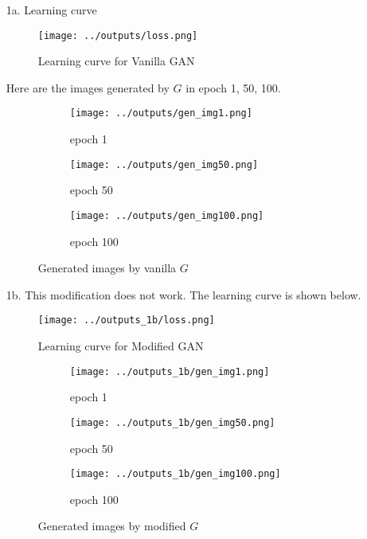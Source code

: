 \documentclass[a4paper]{article}
\theoremstyle{definition}
\newenvironment{soln}{
	\leavevmode\color{blue}\ignorespaces
}{}
\begin{document}
	\begin{soln}
		
		\begin{itemize}
			\item[1a.] 
			Learning curve
			\begin{figure}[H]
				\centering
				\texttt{[image: ../outputs/loss.png]}
				\caption{Learning curve for Vanilla GAN}
				\label{fig:vanilla_gan}
			\end{figure}
			Here are the images generated by $G$ in epoch 1, 50, 100.
			\begin{figure}[H]
				\centering
				\begin{subfigure}[b]{0.3\textwidth}
					\centering
					\texttt{[image: ../outputs/gen\_img1.png]}
					\caption{epoch 1}
				\end{subfigure}
				\hfill
				\begin{subfigure}[b]{0.3\textwidth}
					\centering
					\texttt{[image: ../outputs/gen\_img50.png]}
					\caption{epoch 50}
				\end{subfigure}
				\hfill
				\begin{subfigure}[b]{0.3\textwidth}
					\centering
					\texttt{[image: ../outputs/gen\_img100.png]}
					\caption{epoch 100}
				\end{subfigure}
				\caption{Generated images by vanilla $G$}
				\label{fig:vanilla_gan_img}
			\end{figure}

			\item[1b.]
			This modification does not work. The learning curve is shown below. 
			\begin{figure}[H]
				\centering
				\texttt{[image: ../outputs\_1b/loss.png]}
				\caption{Learning curve for Modified GAN}
				\label{fig:modified_gan}
			\end{figure}
			\begin{figure}[H]
				\centering
				\begin{subfigure}[b]{0.3\textwidth}
					\centering
					\texttt{[image: ../outputs\_1b/gen\_img1.png]}
					\caption{epoch 1}
				\end{subfigure}
				\hfill
				\begin{subfigure}[b]{0.3\textwidth}
					\centering
					\texttt{[image: ../outputs\_1b/gen\_img50.png]}
					\caption{epoch 50}
				\end{subfigure}
				\hfill
				\begin{subfigure}[b]{0.3\textwidth}
					\centering
					\texttt{[image: ../outputs\_1b/gen\_img100.png]}
					\caption{epoch 100}
				\end{subfigure}
				\caption{Generated images by modified $G$}
				\label{fig:modified_gan_img}
			\end{figure}


\end{itemize}
\end{soln}
\end{document}
